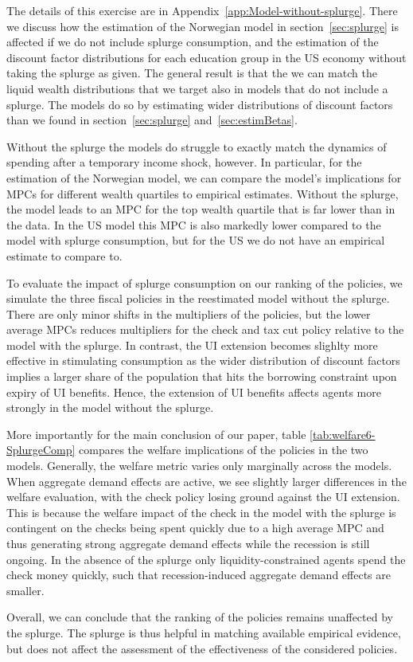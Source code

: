 \documentclass[../HAFiscal]{subfiles}
\begin{document}
The details of this exercise are in Appendix~\ref{app:Model-without-splurge}.
There we discuss how the estimation of the Norwegian model in section~\ref{sec:splurge} is affected if we do not include splurge consumption, and the estimation of the discount factor distributions for each education group in the US economy without taking the splurge as given.
The general result is that the we can match the liquid wealth distributions that we target also in models that do not include a splurge.
The models do so by estimating wider distributions of discount factors than we found in section~\ref{sec:splurge} and~\ref{sec:estimBetas}.

Without the splurge the models do struggle to exactly match the dynamics of spending after a temporary income shock, however.
In particular, for the estimation of the Norwegian model, we can compare the model's implications for MPCs for different wealth quartiles to empirical estimates.
Without the splurge, the model leads to an MPC for the top wealth quartile that is far lower than in the data.
In the US model this MPC is also markedly lower compared to the model with splurge consumption, but for the US we do not have an empirical estimate to compare to.

To evaluate the impact of splurge consumption on our ranking of the policies, we simulate the three fiscal policies in the reestimated model without the splurge.
There are only minor shifts in the multipliers of the policies, but the lower average MPCs reduces multipliers for the check and tax cut policy relative to the model with the splurge.
In contrast, the UI extension becomes slighlty more effective in stimulating consumption as the wider distribution of discount factors implies a larger share of the population that hits the borrowing constraint upon expiry of UI benefits.
Hence, the extension of UI benefits affects agents more strongly in the model without the splurge.

More importantly for the main conclusion of our paper, table \ref{tab:welfare6-SplurgeComp} compares the welfare implications of the policies in the two models.
Generally, the welfare metric varies only marginally across the models.
When aggregate demand effects are active, we see slightly larger differences in the welfare evaluation, with the check policy losing ground against the UI extension.
This is because the welfare impact of the check in the model with the splurge is contingent on the checks being spent quickly due to a high average MPC and thus generating strong aggregate demand effects while the recession is still ongoing.
In the absence of the splurge only liquidity-constrained agents spend the check money quickly, such that recession-induced aggregate demand effects are smaller.



Overall, we can conclude that the ranking of the policies remains unaffected by the splurge.
The splurge is thus helpful in matching available empirical evidence, but does not affect the assessment of the effectiveness of the considered policies.

\smartbib
\end{document}
